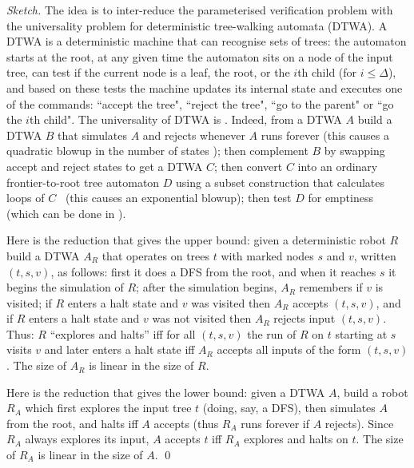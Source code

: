 \begin{proof}[Sketch] 
The idea is to inter-reduce the parameterised verification problem with the universality problem for deterministic tree-walking automata (DTWA).
A DTWA is a deterministic machine that can recognise sets of trees: the automaton starts at the root, at any given time the automaton sits on a node of the input tree, can test if the current node is a leaf, the root, or the $i$th child (for $i \leq \Delta$), and based on these tests the machine updates its internal state and executes one of the commands: ``accept the tree", ``reject the tree", ``go to the parent" or ``go the $i$th child".
The universality of DTWA is \exptimeC.
Indeed, from a DTWA $A$ build a DTWA $B$ that simulates $A$ and rejects whenever $A$ runs forever (this causes a quadratic blowup in the number of states \cite{MML06}); then complement $B$ by swapping accept and reject states to get a DTWA $C$; then convert $C$ into an ordinary frontier-to-root tree automaton $D$ using a subset construction that calculates loops of $C$~\cite[Fact $1$]{Boja08} (this causes an exponential blowup); then test $D$ for emptiness (which can be done in \ptime).

Here is the reduction that gives the upper bound: given a deterministic robot $R$ build a DTWA $A_R$ that operates on trees $t$ with marked nodes $s$ and $v$, written $(t,s,v)$, as follows: first it does a DFS from the root, and when it reaches $s$ it begins the simulation of $R$; after the simulation begins, $A_R$ remembers if $v$ is visited; if $R$ enters a halt state and $v$ was visited then $A_R$ accepts $(t,s,v)$, and if $R$ enters a halt state and $v$ was not visited then $A_R$ rejects input $(t,s,v)$. Thus: $R$ ``explores and halts'' iff for all $(t,s,v)$ the run of $R$ on $t$ starting at $s$ visits $v$ and later enters a halt state iff $A_R$ accepts all inputs of the form $(t,s,v)$. The size of $A_R$ is linear in the size of $R$.

Here is the reduction that gives the lower bound: given a DTWA $A$, build a robot $R_A$ which first explores the input tree $t$ (doing, say, a DFS), then simulates $A$ from the root, and halts iff $A$ accepts (thus $R_A$ runs forever if $A$ rejects). Since $R_A$ always explores its input,  $A$ accepts $t$ iff $R_A$ explores and halts on $t$. The size of $R_A$ is linear in the size of $A$. \qed
\end{proof}

